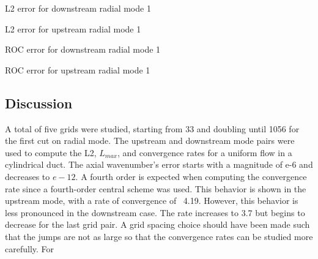 \documentclass[a4paper]{report}
\begin{document}
\begin{table}
    \makebox[\linewidth]{
        
    }
    \caption{L2 error for downstream radial mode 1}
\end{table}
\begin{table}
    \makebox[\linewidth]{
        
    }
    \caption{L2 error for upstream radial mode 1}
\end{table}

\begin{table}
    \makebox[\linewidth]{
        
    }
    \caption{ROC error for downstream radial mode 1}
\end{table}
\begin{table}
    \makebox[\linewidth]{
        
    }
    \caption{ROC error for upstream radial mode 1}
\end{table}
\subsection{Discussion}
A total of five grids were studied, starting from 33 and doubling until 1056 for the
first cut on radial mode. The upstream and downstream mode pairs were used to compute
the L2, $L_{max}$, and convergence rates for a uniform flow in a cylindrical duct. The axial
wavenumber’s error starts with a magnitude of  e-6 and decreases to  $e-12$. A fourth
order is expected when computing the convergence rate since a fourth-order central
scheme was used. This behavior is shown in the upstream mode, with a rate of convergence
of  ~4.19. However, this behavior is less pronounced in the downstream case. The rate
increases to  3.7  but begins to decrease for the last grid pair. A grid spacing choice
should have been made such that the jumps are not as large so that the convergence
rates can be studied more carefully.                                                                                                                                                                                                                                                                                                                                                                                                                                                                                                                       For
\end{document}
